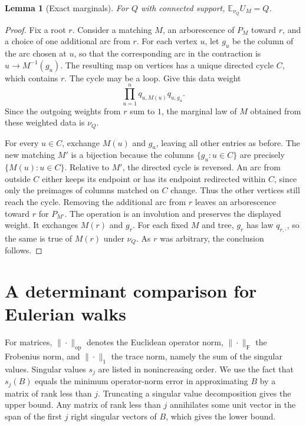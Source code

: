 \documentclass[11pt]{article}
\newcommand{\E}{\mathbb{E}}
\newcommand{\op}{\mathrm{op}}
\newcommand{\Frob}{\mathrm{F}}
\newtheorem{lemma}[theorem]{Lemma}
\begin{document}
\begin{lemma}[Exact marginals]\label{lem:marginals}
For \(Q\) with connected support, \(\E_{\nu_Q}U_M=Q\).
\end{lemma}

\begin{proof}
Fix a root \(r\). Consider a matching \(M\), an arborescence of \(P_M\) toward \(r\), and a choice of one additional arc from \(r\). For each vertex \(u\), let \(g_u\) be the column of the arc chosen at \(u\), so that the corresponding arc in the contraction is \(u\to M^{-1}(g_u)\). The resulting map on vertices has a unique directed cycle \(C\), which contains \(r\). The cycle may be a loop. Give this data weight
\[
 \prod_{u=1}^n q_{u,M(u)}q_{u,g_u}.
\]
Since the outgoing weights from \(r\) sum to \(1\), the marginal law of \(M\) obtained from these weighted data is \(\nu_Q\).

For every \(u\in C\), exchange \(M(u)\) and \(g_u\), leaving all other entries as before. The new matching \(M'\) is a bijection because the columns \(\{g_u:u\in C\}\) are precisely \(\{M(u):u\in C\}\). Relative to \(M'\), the directed cycle is reversed. An arc from outside \(C\) either keeps its endpoint or has its endpoint redirected within \(C\), since only the preimages of columns matched on \(C\) change. Thus the other vertices still reach the cycle. Removing the additional arc from \(r\) leaves an arborescence toward \(r\) for \(P_{M'}\). The operation is an involution and preserves the displayed weight. It exchanges \(M(r)\) and \(g_r\). For each fixed \(M\) and tree, \(g_r\) has law \(q_{r,\cdot}\), so the same is true of \(M(r)\) under \(\nu_Q\). As \(r\) was arbitrary, the conclusion follows.
\end{proof}

\section{A determinant comparison for Eulerian walks}\label{sec:comparison}

For matrices, \(\|\cdot\|_{\op}\) denotes the Euclidean operator norm, \(\|\cdot\|_{\Frob}\) the Frobenius norm, and \(\|\cdot\|_1\) the trace norm, namely the sum of the singular values. Singular values \(s_j\) are listed in nonincreasing order. We use the fact that \(s_j(B)\) equals the minimum operator-norm error in approximating \(B\) by a matrix of rank less than \(j\). Truncating a singular value decomposition gives the upper bound. Any matrix of rank less than \(j\) annihilates some unit vector in the span of the first \(j\) right singular vectors of \(B\), which gives the lower bound.
\end{document}
